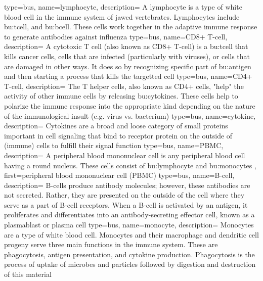 {
    type=bus,
    name=lymphocyte,
    description={
        A lymphocyte is a type of white blood cell in the immune system of jawed vertebrates.
        Lymphocytes include \gls{bu:tcell}, and \gls{bu:bcell}.
        These cells work together in the adaptive immune response to generate antibodies against influenza
    }
}
{
    type=bus,
    name=CD8+ T-cell,
    description={
        A cytotoxic T cell (also known as CD8+ T-cell) is a \gls{bu:tcell} that kills cancer cells, cells that are infected (particularly with viruses), or cells that are damaged in other ways.
        It does so by recognizing specific part of \gls{bu:antigen} and then starting a process that kills the targetted cell
    }
}
{
    type=bus,
    name=CD4+ T-cell,
    description={
        The T helper cells, also known as CD4+ cells, "help" the activity of other immune cells by releasing \gls{bu:cytokine}s.
        These cells help to polarize the immune response into the appropriate kind depending on the nature of the immunological insult (e.g. virus vs. bacterium)
    }
}
{
    type=bus,
    name=cytokine,
    description={
        Cytokines are a broad and loose category of small proteins important in cell signaling that bind to receptor protein on the outside of (immune) cells to fulfill their signal function
    }
}
{
    type=bus,
    name=PBMC,
    description={
        A peripheral blood mononuclear cell is any peripheral blood cell having a round nucleus.
        These cells consist of \gls{bu:lymphocyte} and \gls{bu:monocyte}s
    },
    first={peripheral blood mononuclear cell (PBMC)}
}
{
    type=bus,
    name=B-cell,
    description={
        B-cells produce antibody molecules; however, these antibodies are not secreted.
        Rather, they are presented on the outside of the cell where they serve as a part of B-cell receptors.
        When a B-cell is activated by an antigen, it proliferates and differentiates into an antibody-secreting effector cell, known as a plasmablast or plasma cell
    }
}
{
    type=bus,
    name=monocyte,
    description={
        Monocytes are a type of white blood cell.
        Monocytes and their macrophage and dendritic cell progeny serve three main functions in the immune system.
        These are phagocytosis, antigen presentation, and cytokine production.
        Phagocytosis is the process of uptake of microbes and particles followed by digestion and destruction of this material
    }
}
